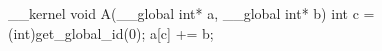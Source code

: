 __kernel void A(__global int* a, __global int* b) {
  int c = (int)get_global_id(0);
  a[c] += b;
}
